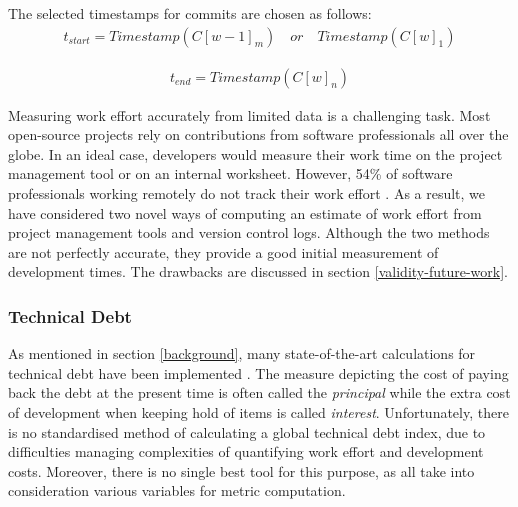 \documentclass{mpaper}
\begin{document}
The selected timestamps for commits are chosen as follows:
\begin{equation}
  \label{eq-commit-start}
  \begin{aligned}
    t_{start} = Timestamp(C[w-1]_{m}) \quad or \quad Timestamp(C[w]_{1})
  \end{aligned}
\end{equation}

\begin{equation}
  \label{eq-commit-end}
  \begin{aligned}
    t_{end} = Timestamp(C[w]_{n})
  \end{aligned}
\end{equation}

Measuring work effort accurately from limited data is a challenging task. Most
open-source projects rely on contributions from software professionals all over
the globe. In an ideal case, developers would measure their work time on the
project management tool or on an internal worksheet. However, 54\% of software
professionals working remotely do not track their work effort
\cite{DeveloperSurvey2018}. As a result, we have considered two novel ways of
computing an estimate of work effort from project management tools and version
control logs. Although the two methods are not perfectly accurate, they provide
a good initial measurement of development times. The drawbacks are discussed in
section \ref{validity-future-work}.

\subsubsection*{Technical Debt}

As mentioned in section \ref{background}, many state-of-the-art calculations for
technical debt have been implemented \cite{Letouzey2012} \cite{Nugroho2011}
\cite{Fontana2016}. The measure depicting the cost of paying back the debt at
the present time is often called the \emph{principal} while the extra cost of
development when keeping hold of items is called \emph{interest}. Unfortunately,
there is no standardised method of calculating a global technical debt index,
due to difficulties managing complexities of quantifying work effort and
development costs. Moreover, there is no single best tool for this purpose, as
all take into consideration various variables for metric computation. 
\end{document}
